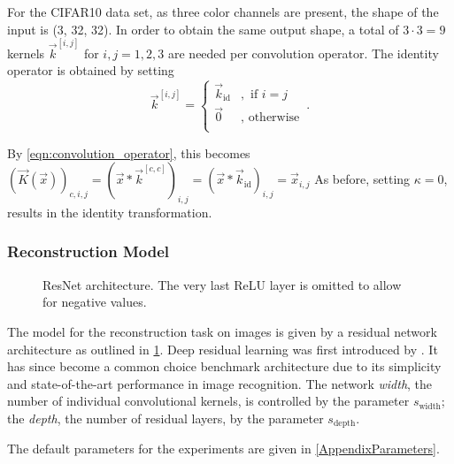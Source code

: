 For the CIFAR10 data set, as three color channels are present, the shape of the input is (3, 32, 32). 
In order to obtain the same output shape, 
a total of $3\cdot 3=9$ kernels $\vec k^{[i,j]}$ for $i,j=1,2,3$ are needed per convolution operator.
The identity operator is obtained by setting 
\[
    \vec k^{[i,j]} = \begin{cases}
        \vec k_{\text{id}} &, \text{ if } i = j\\
        \vec 0 &, \text{ otherwise} \\
    \end{cases} \,.
\]

By \cref{eqn:convolution_operator}, this becomes $(\vec K (\vec x))_{c,i,j}
    = \left ( \vec x * \vec k^{[c,c]} \right )_{i,j} = (\vec x * \vec k_\text{id})_{i, j} = \vec x _{i,j}$
As before, setting $\kappa = 0$, results in the identity transformation.


\subsubsection{Reconstruction Model}

\begin{figure}[!ht]
{\begin{minipage}{0.5\textwidth}
\centering

\end{minipage}
\hfill
\begin{minipage}{0.5\textwidth}
\centering

\end{minipage}}
\caption{ResNet architecture. The very last ReLU layer is omitted to allow for negative values.}
\label{fig:resnet}
\end{figure}

The model for the reconstruction task on images is given by a residual network architecture
as outlined in \cref{fig:resnet}. 
Deep residual learning was first introduced by \cite{Resnet}.
It has since become a common choice benchmark architecture due to its simplicity and state-of-the-art performance
in image recognition.
The network \textit{width}, the number of individual convolutional kernels, is controlled by the parameter $s_\text{width}$; the \textit{depth}, the number of residual layers, by the parameter
$s_\text{depth}$.

The default parameters for the experiments are given in \cref{AppendixParameters}.




